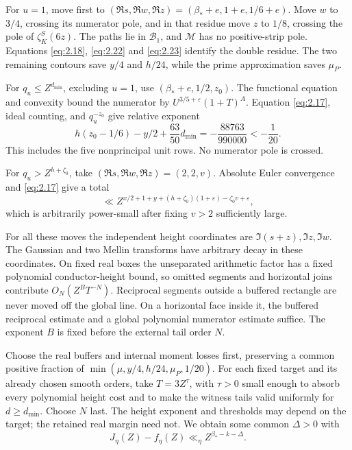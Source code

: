 \documentclass[11pt,a4paper]{article}
\begin{document}
For \(u=1\), move first to \((\Re s,\Re w,\Re z)=(\beta_*+e,1+e,1/6+e)\). Move \(w\) to \(3/4\), crossing its numerator pole, and in that residue move \(z\) to \(1/8\), crossing the pole of \(\zeta_K^S(6z)\). The paths lie in \(\mathcal B_1\), and \(\mathscr M\) has no positive-strip pole. Equations \eqref{eq:2.18}, \eqref{eq:2.22} and \eqref{eq:2.23} identify the double residue. The two remaining contours save \(y/4\) and \(h/24\), while the prime approximation saves \(\mu_P\).

For \(q_u\le Z^{d_{\min}}\), excluding \(u=1\), use \((\beta_*+e,1/2,z_0)\). The functional equation and convexity bound the numerator by \(U^{3/5+\varepsilon}(1+T)^A\). Equation \eqref{eq:2.17}, ideal counting, and \(q_u^{-z_0}\) give relative exponent \[
 h(z_0-1/6)-y/2+\frac{63}{50}d_{\min}
 =-\frac{88763}{990000}<-\frac1{20}.
\tag{5.4}\label{eq:5.4}
\] This includes the five nonprincipal unit rows. No numerator pole is crossed.

For \(q_u>Z^{h+\zeta_0}\), take \((\Re s,\Re w,\Re z)=(2,2,v)\). Absolute Euler convergence and \eqref{eq:2.17} give a total \[
 \ll Z^{x/2+1+y+(h+\zeta_0)(1+\varepsilon)-\zeta_0v+\varepsilon},
\tag{5.5}\label{eq:5.5}
\] which is arbitrarily power-small after fixing \(v>2\) sufficiently large.

For all these moves the independent height coordinates are \(\Im(s+z),\Im z,\Im w\). The Gaussian and two Mellin transforms have arbitrary decay in these coordinates. On fixed real boxes the unseparated arithmetic factor has a fixed polynomial conductor-height bound, so omitted segments and horizontal joins contribute \(O_N(Z^BT^{-N})\). Reciprocal segments outside a buffered rectangle are never moved off the global line. On a horizontal face inside it, the buffered reciprocal estimate and a global polynomial numerator estimate suffice. The exponent \(B\) is fixed before the external tail order \(N\).

Choose the real buffers and internal moment losses first, preserving a common positive fraction of \(\min(\mu,y/4,h/24,\mu_P,1/20)\). For each fixed target and its already chosen smooth orders, take \(T=3Z^\tau\), with \(\tau>0\) small enough to absorb every polynomial height cost and to make the witness tails valid uniformly for \(d\ge d_{\min}\). Choose \(N\) last. The height exponent and thresholds may depend on the target; the retained real margin need not. We obtain some common \(\Delta>0\) with \[
 J_\eta(Z)-f_\eta(Z)\ll_\eta Z^{\beta_*-k-\Delta}.
\tag{5.6}\label{eq:5.6}
\]
\end{document}

